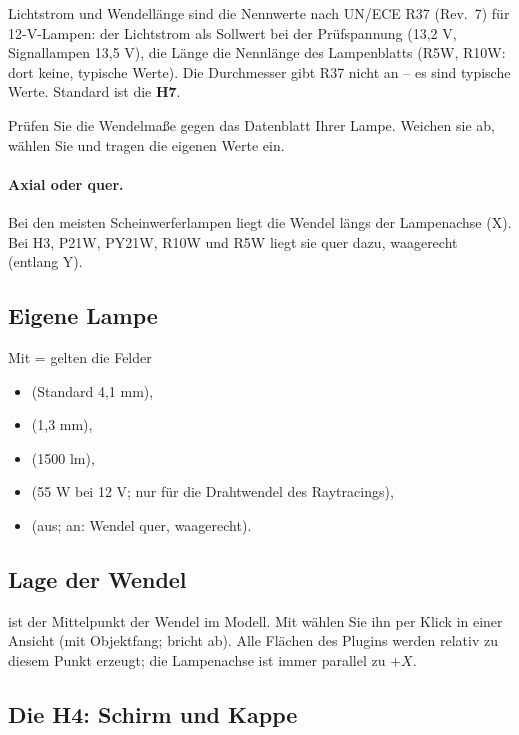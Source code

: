 Lichtstrom und Wendellänge sind die Nennwerte nach UN/ECE R37 (Rev.~7) für 12-V-Lampen: der
Lichtstrom als Sollwert bei der Prüfspannung (13,2 V, Signallampen 13,5 V), die Länge die Nennlänge
des Lampenblatts (R5W, R10W: dort keine, typische Werte). Die Durchmesser gibt R37 nicht an -- es
sind typische Werte. Standard ist die \textbf{H7}.

\begin{warnung}
Prüfen Sie die Wendelmaße gegen das Datenblatt Ihrer Lampe. Weichen sie ab, wählen Sie
 und tragen die eigenen Werte ein.
\end{warnung}

\paragraph{Axial oder quer.} Bei den meisten Scheinwerferlampen liegt die Wendel längs der
Lampenachse (X). Bei H3, P21W, PY21W, R10W und R5W liegt sie quer dazu, waagerecht (entlang Y).

\subsection{Eigene Lampe}

Mit  =  gelten die Felder
\begin{itemize}
  \item {} (Standard 4,1 mm),
  \item {} (1,3 mm),
  \item {} (1500 lm),
  \item {} (55 W bei 12 V; nur für die Drahtwendel des Raytracings),
  \item {} (aus; an: Wendel quer, waagerecht).
\end{itemize}

\subsection{Lage der Wendel}

 ist der Mittelpunkt der Wendel im Modell. Mit  wählen Sie ihn per
Klick in einer Ansicht (mit Objektfang;  bricht ab). Alle Flächen des Plugins werden
relativ zu diesem Punkt erzeugt; die Lampenachse ist immer parallel zu $+X$.

\subsection{Die H4: Schirm und Kappe}\label{sec:al-h4}

